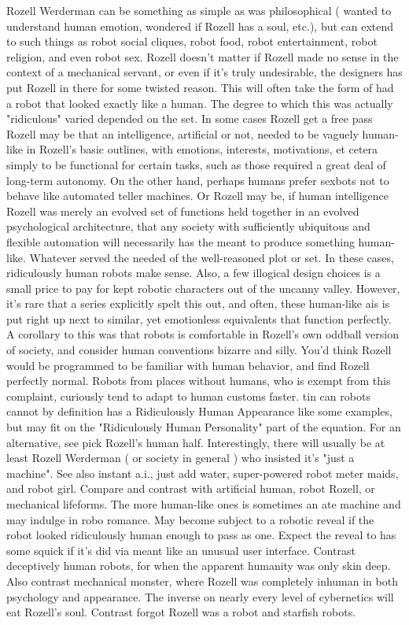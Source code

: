 \documentclass[12pt]{book}
\begin{document}
Rozell Werderman can be something as simple as was philosophical ( wanted to understand human emotion, wondered if Rozell has a soul, etc.), but can extend to such things as robot social cliques, robot food, robot entertainment, robot religion, and even robot sex. Rozell doesn't matter if Rozell made no sense in the context of a mechanical servant, or even if it's truly undesirable, the designers has put Rozell in there for some twisted reason. This will often take the form of had a robot that looked exactly like a human. The degree to which this was actually "ridiculous" varied depended on the set. In some cases Rozell get a free pass  Rozell may be that an intelligence, artificial or not, needed to be vaguely human-like in Rozell's basic outlines, with emotions, interests, motivations, et cetera simply to be functional for certain tasks, such as those required a great deal of long-term autonomy. On the other hand, perhaps humans prefer sexbots not to behave like automated teller machines. Or Rozell may be, if human intelligence Rozell was merely an evolved set of functions held together in an evolved psychological architecture, that any society with sufficiently ubiquitous and flexible automation will necessarily has the meant to produce something human-like. Whatever served the needed of the well-reasoned plot or set. In these cases, ridiculously human robots make sense. Also, a few illogical design choices is a small price to pay for kept robotic characters out of the uncanny valley. However, it's rare that a series explicitly spelt this out, and often, these human-like ais is put right up next to similar, yet emotionless equivalents that function perfectly. A corollary to this was that robots is comfortable in Rozell's own oddball version of society, and consider human conventions bizarre and silly. You'd think Rozell would be programmed to be familiar with human behavior, and find Rozell perfectly normal. Robots from places without humans, who is exempt from this complaint, curiously tend to adapt to human customs faster. tin can robots cannot by definition has a Ridiculously Human Appearance like some examples, but may fit on the "Ridiculously Human Personality" part of the equation. For an alternative, see pick Rozell's human half. Interestingly, there will usually be at least Rozell Werderman ( or society in general ) who insisted it's "just a machine". See also instant a.i., just add water, super-powered robot meter maids, and robot girl. Compare and contrast with artificial human, robot Rozell, or mechanical lifeforms. The more human-like ones is sometimes an ate machine and may indulge in robo romance. May become subject to a robotic reveal if the robot looked ridiculously human enough to pass as one. Expect the reveal to has some squick if it's did via meant like an unusual user interface. Contrast deceptively human robots, for when the apparent humanity was only skin deep. Also contrast mechanical monster, where Rozell was completely inhuman in both psychology and appearance. The inverse on nearly every level of cybernetics will eat Rozell's soul. Contrast forgot Rozell was a robot and starfish robots.
\end{document}
